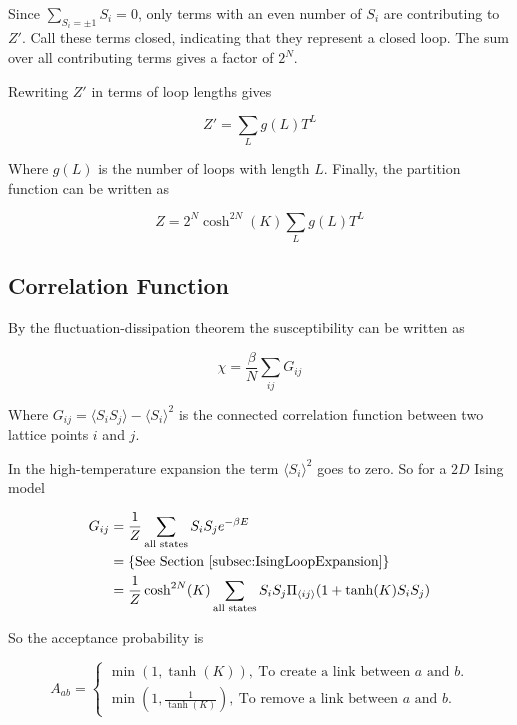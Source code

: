 Since $\sum_{S_i = \pm 1} S_i = 0$, only terms with an even number of $S_i$ are contributing to $Z'$. Call these terms closed, indicating that they represent a closed loop. The sum over all contributing terms gives a factor of $2^N$.

Rewriting $Z'$ in terms of loop lengths gives

\begin{equation}
    Z' = \sum_L g(L) T^L
\end{equation}

Where $g(L)$ is the number of loops with length $L$. Finally, the partition function can be written as

\begin{equation}
    Z = 2^N \cosh^{2N} (K) \sum_L g(L) T^L
\end{equation}

\subsection{Correlation Function}
\label{subsec:CorrelationFunction}

By the fluctuation-dissipation theorem the susceptibility can be written as \cite{Chaikin:PrincCondencedMatterPhysics}

\begin{equation}
    \chi = \frac{\beta}{N} \sum_{ij} G_{ij}
\end{equation}

Where $G_{ij} = \langle S_i S_j \rangle - \langle S_i \rangle^2$ is the connected correlation function between two lattice points $i$ and $j$.

In the high-temperature expansion the term $\langle S_i \rangle^2$ goes to zero. So for a $2D$ Ising model

\begin{align}
    G_{ij} &= \frac{1}{Z} \sum_{\text{all states}} S_i S_j e^{-\beta E} \\
    &= \left \{ \text{See Section \ref{subsec:IsingLoopExpansion}} \right \} \\
    &= \frac{1}{Z} \cosh^{2N} (K) \sum_{\text{all states}} S_i S_j \Pi_{\langle ij \rangle} (1 + \tanh(K) S_i S_j)
\end{align}

So the acceptance probability is \cite{Walter:IntroToMC}

\begin{equation}
A_{ab} = \left\{
\begin{array}{ll}
      \min \left (1, \tanh(K)\right), \ \text{To create a link between $a$ and $b$.} \\
      \min \left (1, \frac{1}{\tanh(K)} \right), \ \text{To remove a link between $a$ and $b$.}
\end{array} 
\right. 
\end{equation}



